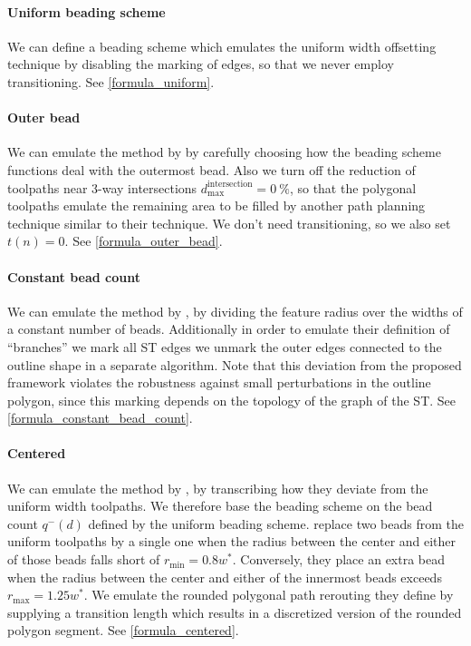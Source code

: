 \paragraph{Uniform beading scheme}
We can define a beading scheme which emulates the uniform width offsetting technique by disabling the marking of edges, so that we never employ transitioning.
See \cref{formula_uniform}.


\paragraph{Outer bead}
We can emulate the method by \citeauthor{Moesen2011} by carefully choosing how the beading scheme functions deal with the outermost bead.
Also we turn off the reduction of toolpaths near 3-way intersections $d_\text{max}^\text{intersection} = \SI{0}{\percent}$, so that the polygonal toolpaths emulate the remaining area to be filled by another path planning technique similar to their technique.
We don't need transitioning, so we also set $t(n) = 0 $.
See \cref{formula_outer_bead}.



\paragraph{Constant bead count}
We can emulate the method by \citeauthor{Ding2016a}, by dividing the feature radius over the widths of a constant number of beads.
Additionally in order to emulate their definition of ``branches'' we mark all ST edges we unmark the outer edges connected to the outline shape in a separate algorithm.
Note that this deviation from the proposed framework violates the robustness against small perturbations in the outline polygon, since this marking depends on the topology of the graph of the ST.
See \cref{formula_constant_bead_count}.




\paragraph{Centered}
We can emulate the method by \citeauthor{Jin2017JMS}, by transcribing how they deviate from the uniform width toolpaths.
We therefore base the beading scheme on the bead count $q^-(d)$ defined by the uniform beading scheme.
\citeauthor{Jin2017JMS} replace two beads from the uniform toolpaths by a single one when the radius between the center and either of those beads falls short of $r_\text{min} = 0.8 w^*$.
Conversely, they place an extra bead when the radius between the center and either of the innermost beads exceeds $r_\text{max} = 1.25 w^*$.\cite{Jin2017JMS}
We emulate the rounded polygonal path rerouting they define by supplying a transition length which results in a discretized version of the rounded polygon segment.
See \cref{formula_centered}.






